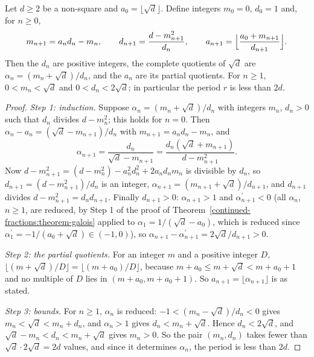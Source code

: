\begin{proposition}\label{continued-fractions:proposition-sqrt-algorithm}
Let $d \geq 2$ be a non-square and $a_0 = \lfloor\sqrt d\rfloor$. Define integers $m_0 = 0$, $d_0 = 1$ and, for $n \geq 0$,
\[
m_{n+1} = a_nd_n - m_n, \qquad d_{n+1} = \frac{d - m_{n+1}^2}{d_n}, \qquad a_{n+1} = \Bigl\lfloor \frac{a_0 + m_{n+1}}{d_{n+1}} \Bigr\rfloor.
\]
Then the $d_n$ are positive integers, the complete quotients of $\sqrt d$ are $\alpha_n = (m_n + \sqrt d)/d_n$, and the $a_n$ are its partial quotients. For $n \geq 1$,
$0 < m_n < \sqrt d$ and $0 < d_n < 2\sqrt d$; in particular the period $r$ is less than $2d$.
\end{proposition}

\begin{proof}
\emph{Step 1: induction.} Suppose $\alpha_n = (m_n + \sqrt d)/d_n$ with integers $m_n$, $d_n > 0$ such that $d_n$ divides $d - m_n^2$; this holds for $n = 0$. Then
$\alpha_n - a_n = (\sqrt d - m_{n+1})/d_n$ with $m_{n+1} = a_nd_n - m_n$, and
\[
\alpha_{n+1} = \frac{d_n}{\sqrt d - m_{n+1}} = \frac{d_n(\sqrt d + m_{n+1})}{d - m_{n+1}^2}.
\]
Now $d - m_{n+1}^2 = (d - m_n^2) - a_n^2d_n^2 + 2a_nd_nm_n$ is divisible by $d_n$, so $d_{n+1} = (d - m_{n+1}^2)/d_n$ is an integer, $\alpha_{n+1} = (m_{n+1} + \sqrt d)/d_{n+1}$, and $d_{n+1}$ divides
$d - m_{n+1}^2 = d_nd_{n+1}$. Finally $d_{n+1} > 0$: $\alpha_{n+1} > 1$ and $\alpha_{n+1}^{\prime} < 0$ (all $\alpha_n$, $n \geq 1$, are reduced, by Step 1 of the proof of
Theorem~\ref{continued-fractions:theorem-galois} applied to $\alpha_1 = 1/(\sqrt d - a_0)$, which is reduced since $\alpha_1^{\prime} = -1/(a_0 + \sqrt d) \in (-1, 0)$), so
$\alpha_{n+1} - \alpha_{n+1}^{\prime} = 2\sqrt d/d_{n+1} > 0$.

\emph{Step 2: the partial quotients.} For an integer $m$ and a positive integer $D$, $\lfloor (m + \sqrt d)/D \rfloor = \lfloor (m + a_0)/D \rfloor$, because $m + a_0 \leq m + \sqrt d < m + a_0 + 1$ and no
multiple of $D$ lies in $(m + a_0, m + a_0 + 1)$. So $a_{n+1} = \lfloor\alpha_{n+1}\rfloor$ is as stated.

\emph{Step 3: bounds.} For $n \geq 1$, $\alpha_n$ is reduced: $-1 < (m_n - \sqrt d)/d_n < 0$ gives $m_n < \sqrt d < m_n + d_n$, and $\alpha_n > 1$ gives $d_n < m_n + \sqrt d$. Hence $d_n < 2\sqrt d$,
and $\sqrt d - m_n < d_n < m_n + \sqrt d$ gives $m_n > 0$. So the pair $(m_n, d_n)$ takes fewer than $\sqrt d \cdot 2\sqrt d = 2d$ values, and since it
determines $\alpha_n$, the period is less than $2d$.
\end{proof}

